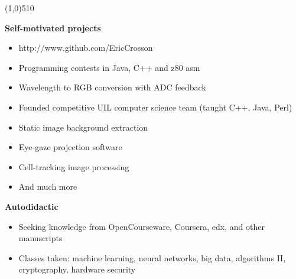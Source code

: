 \documentclass{report}
\newcommand{\cut}{\begin{center} \line(1,0){510} \end{center}}
\begin{document}
\cut{}

\textbf{Self-motivated projects}
\begin{paracol}{2}

  \begin{itemize}[label=$\circ$]
  \item http://www.github.com/EricCrosson
  \item Programming contests in Java, C++ and z80 asm
  \item Wavelength to RGB conversion with ADC feedback
  \item Founded competitive UIL computer science team (taught C++, Java, Perl)
  \end{itemize}

  \switchcolumn{}
  \begin{itemize}[label=$\circ$]
  \item Static image background extraction
  \item Eye-gaze projection software
  \item Cell-tracking image processing
  \item And much more
  \end{itemize}
\end{paracol}

\textbf{Autodidactic}
\begin{itemize}[label=$\circ$]
\item Seeking knowledge from OpenCourseware, Coursera, edx, and other manuscripts
\item Classes taken: machine learning, neural networks, big data, algorithms II,
  cryptography, hardware security
\end{itemize}


\end{document}
